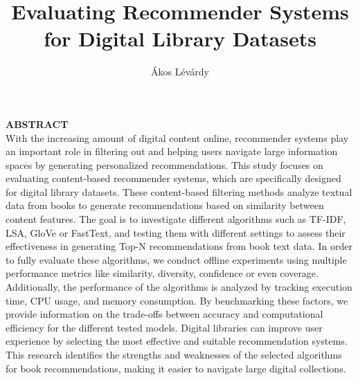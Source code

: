\documentclass[10pt, oneside,english,hidelinks,a4paper]{article}
\title{\textbf{Evaluating Recommender Systems for Digital Library Datasets}}
\author{Ákos Lévárdy}
\date{} %
\begin{document}
%
\maketitle %
%
\vspace{20mm}  %
%
\setlength{\columnsep}{30pt}
\begin{multicols}{2}
\noindent
\textbf{ABSTRACT}\\
With the increasing amount of digital content online, recommender systems play an important role in filtering out and helping users navigate large information spaces by generating personalized recommendations. This study focuses on evaluating content-based recommender systems, which are specifically designed for digital library datasets. These content-based filtering methods analyze textual data from books to generate recommendations based on similarity between content features. The goal is to investigate different algorithms such as TF-IDF, LSA, GloVe or FastText, and testing them with different settings to assess their effectiveness in generating Top-N recommendations from book text data. 
In order to fully evaluate these algorithms, we conduct offline experiments using multiple performance metrics like similarity, diversity, confidence or even coverage. Additionally, the performance of the algorithms is analyzed by tracking execution time, CPU usage, and memory consumption. By benchmarking these factors, we provide information on the trade-offs between accuracy and computational efficiency for the different tested models. Digital libraries can improve user experience by selecting the most effective and suitable recommendation systems. This research identifies the strengths and weaknesses of the selected algorithms for book recommendations, making it easier to navigate large digital collections.\\\\
%

\end{multicols}
\end{document}
